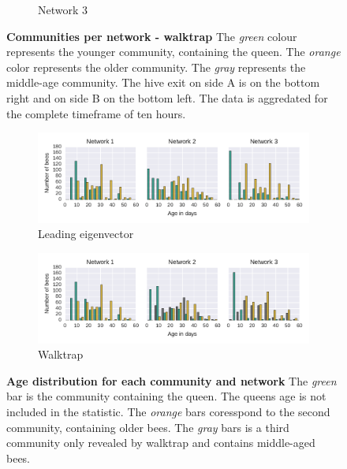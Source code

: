 \begin{figure}[htb]
\begin{subfigure}[b]{1.0\textwidth}
		\caption[Network 3]{Network 3}
		\label{fig:wt3}
		\vspace*{5mm}
	\end{subfigure}
	\caption[Communities per network - walktrap]{\textbf{Communities per network - walktrap} The \emph{green} colour represents the younger community, containing the queen. The \emph{orange} color represents the older community. The \emph{gray} represents the middle-age community. The hive exit on side A is on the bottom right and on side B on the bottom left. The data is aggredated for the complete timeframe of ten hours.}
	\label{fig:communitiesPerNetworkWT}
\end{figure}



\begin{figure}[htb]
	\centering
	\begin{subfigure}[b]{1.0\textwidth}
		\centering
		\includegraphics[width=1.0\textwidth]{Figures/ageDistribution-LE}
		\caption[Leading eigenvector]{Leading eigenvector}
		\label{fig:ageLE}
		\vspace*{5mm}
	\end{subfigure}
	\begin{subfigure}[b]{1.0\textwidth}	
		\centering
		\includegraphics[width=1.0\textwidth]{Figures/ageDistribution-WT}
		\caption[Walktrap]{Walktrap}
		\label{fig:ageWT}
		\vspace*{5mm}
	\end{subfigure}
	\caption[Age distribution for each community and network] {\textbf{Age distribution for each community and network} The \emph{green} bar is the community containing the queen. The queens age is not included in the statistic. The \emph{orange} bars coresspond to the second community, containing older bees. The \emph{gray} bars is a third community only revealed by walktrap and contains middle-aged bees.}
	\label{fig:ageDistribution}
\end{figure}

